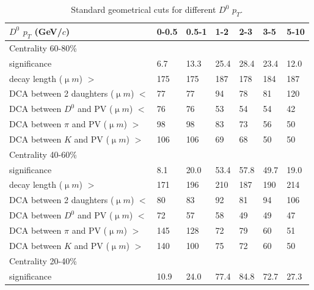 \begin{table}[htp]
  \centering
  \caption{Standard geometrical cuts for different $D^0$ $p_T$.}
  \label{geometryCuts}
  \begin{center}
    \begin{tabular}{l|l|l|l|l|l|l}
      $D^0$ $p_T$ (GeV/$c$) & 0-0.5 & 0.5-1 & 1-2 & 2-3 & 3-5 & 5-10\\ \hline
      Centrality  60-80\% & &  & &  & & \\ \hline
      significance & 6.7 & 13.3 & 25.4 & 28.4 & 23.4 & 12.0\\ \hline
      decay length (${\upmu}m$) $>$ & 175 & 175 & 187 & 178 & 184 & 187\\ \hline
      DCA between 2 daughters (${\upmu}m$) $<$ & 77 & 77 & 94 & 78 & 81 & 120\\ \hline
      DCA between $D^0$ and PV (${\upmu}m$) $<$ & 76 & 76 & 53 & 54 & 54 & 42\\ \hline
      DCA between $\pi$ and PV (${\upmu}m$) $>$ & 98 & 98 & 83 & 73 & 56 & 50\\ \hline
      DCA between $K$ and PV (${\upmu}m$) $>$ & 106 & 106 & 69 & 68 & 50 & 50\\ \hline
      Centrality  40-60\% &  &  &  &  & & \\ \hline
      significance & 8.1 & 20.0 & 53.4 & 57.8 & 49.7 & 19.0\\ \hline
      decay length (${\upmu}m$) $>$ & 171 & 196 & 210 & 187 & 190 & 214\\ \hline
      DCA between 2 daughters (${\upmu}m$) $<$ & 80 & 83 & 92 & 81 & 94 & 106\\ \hline
      DCA between $D^0$ and PV (${\upmu}m$) $<$ & 72 & 57 & 58 & 49 & 49 & 47\\ \hline
      DCA between $\pi$ and PV (${\upmu}m$) $>$ & 145 & 128 & 72 & 79 & 60 & 51\\ \hline
      DCA between $K$ and PV (${\upmu}m$) $>$ & 140 & 100 & 75 & 72 & 60 & 50\\ \hline
      Centrality  20-40\% &  &  &  &  & & \\ \hline
      significance & 10.9 & 24.0 & 77.4 & 84.8 & 72.7 & 27.3\\ \hline

\end{tabular}
\end{center}
\end{table}
